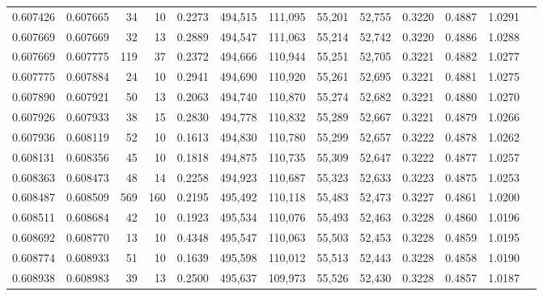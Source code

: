 \begin{tabular}{rrrrrrrrrrrrr}
0.607426 & 0.607665 &    34 &  10 &                                     0.2273 & 494,515 & 111,095 &  55,201 &  52,755 & 0.3220 & 0.4887 & 1.0291 \\
0.607669 & 0.607669 &    32 &  13 &                                     0.2889 & 494,547 & 111,063 &  55,214 &  52,742 & 0.3220 & 0.4886 & 1.0288 \\
0.607669 & 0.607775 &   119 &  37 &                                     0.2372 & 494,666 & 110,944 &  55,251 &  52,705 & 0.3221 & 0.4882 & 1.0277 \\
0.607775 & 0.607884 &    24 &  10 &                                     0.2941 & 494,690 & 110,920 &  55,261 &  52,695 & 0.3221 & 0.4881 & 1.0275 \\
0.607890 & 0.607921 &    50 &  13 &                                     0.2063 & 494,740 & 110,870 &  55,274 &  52,682 & 0.3221 & 0.4880 & 1.0270 \\
0.607926 & 0.607933 &    38 &  15 &                                     0.2830 & 494,778 & 110,832 &  55,289 &  52,667 & 0.3221 & 0.4879 & 1.0266 \\
0.607936 & 0.608119 &    52 &  10 &                                     0.1613 & 494,830 & 110,780 &  55,299 &  52,657 & 0.3222 & 0.4878 & 1.0262 \\
0.608131 & 0.608356 &    45 &  10 &                                     0.1818 & 494,875 & 110,735 &  55,309 &  52,647 & 0.3222 & 0.4877 & 1.0257 \\
0.608363 & 0.608473 &    48 &  14 &                                     0.2258 & 494,923 & 110,687 &  55,323 &  52,633 & 0.3223 & 0.4875 & 1.0253 \\
0.608487 & 0.608509 &   569 & 160 &                                     0.2195 & 495,492 & 110,118 &  55,483 &  52,473 & 0.3227 & 0.4861 & 1.0200 \\
0.608511 & 0.608684 &    42 &  10 &                                     0.1923 & 495,534 & 110,076 &  55,493 &  52,463 & 0.3228 & 0.4860 & 1.0196 \\
0.608692 & 0.608770 &    13 &  10 &                                     0.4348 & 495,547 & 110,063 &  55,503 &  52,453 & 0.3228 & 0.4859 & 1.0195 \\
0.608774 & 0.608933 &    51 &  10 &                                     0.1639 & 495,598 & 110,012 &  55,513 &  52,443 & 0.3228 & 0.4858 & 1.0190 \\
0.608938 & 0.608983 &    39 &  13 &                                     0.2500 & 495,637 & 109,973 &  55,526 &  52,430 & 0.3228 & 0.4857 & 1.0187 \\

\end{tabular}
